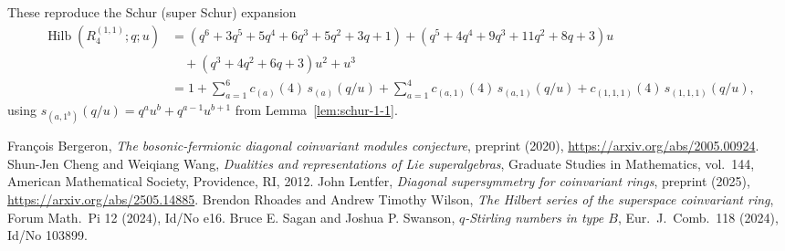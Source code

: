 \documentclass[11pt]{amsart}
\theoremstyle{definition}
\DeclareMathOperator{\Hilb}{Hilb}
\begin{document}
These reproduce the Schur (super Schur) expansion
\begin{align*}
\Hilb(R_4^{(1,1)};q;u)
&= (q^6+3q^5+5q^4+6q^3+5q^2+3q+1)
 + (q^5+4q^4+9q^3+11q^2+8q+3)u\\
&\quad + (q^3+4q^2+6q+3)u^2 + u^3\\
&= 1+\sum_{a=1}^{6} c_{(a)}(4)\,s_{(a)}(q/u)
 + \sum_{a=1}^{4} c_{(a,1)}(4)\,s_{(a,1)}(q/u)
 + c_{(1,1,1)}(4)\,s_{(1,1,1)}(q/u),
\end{align*}
using $s_{(a,1^b)}(q/u)=q^au^b+q^{a-1}u^{b+1}$ from
Lemma~\ref{lem:schur-1-1}.

\begin{thebibliography}{99}
 Fran\c{c}ois Bergeron, \emph{The bosonic-fermionic
diagonal coinvariant modules conjecture}, preprint (2020),
\url{https://arxiv.org/abs/2005.00924}.
 Shun-Jen Cheng and Weiqiang Wang, \emph{Dualities and
representations of Lie superalgebras}, Graduate Studies in Mathematics, vol.\
144, American Mathematical Society, Providence, RI, 2012.
 John Lentfer, \emph{Diagonal supersymmetry for
coinvariant rings}, preprint (2025), \url{https://arxiv.org/abs/2505.14885}.
\bibitem{RhoadesWilson2023} Brendon Rhoades and Andrew Timothy Wilson, \emph{The
Hilbert series of the superspace coinvariant ring}, Forum Math.\ Pi 12 (2024),
Id/No e16.
 Bruce E. Sagan and Joshua P. Swanson, \emph{$q$-Stirling
numbers in type $B$}, Eur.\ J.\ Comb.\ 118 (2024), Id/No 103899.
\end{thebibliography}
\end{document}
